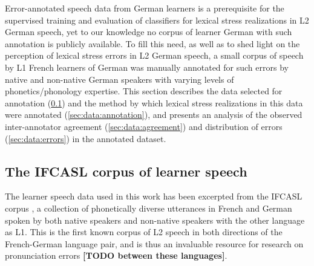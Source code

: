 \documentclass[a4paper]{article}
\newcommand{\TODO}[1]{{\color{red}\textbf{[TODO #1]}}}
\begin{document}
	Error-annotated speech data from German learners is a prerequisite for the supervised training and evaluation of classifiers for  lexical stress realizations in L2 German speech, yet to our knowledge no corpus of learner German with such annotation is publicly available. To fill this need, as well as to shed light on the perception of lexical stress errors in L2 German speech, a small corpus of speech by L1 French learners of German was manually annotated for such errors by native and non-native German speakers with varying levels of phonetics/phonology expertise. This section describes the data selected for annotation (\cref{sec:data:corpus}) and the method by which lexical stress realizations in this data were annotated (\cref{sec:data:annotation}), and presents an analysis of the observed inter-annotator agreement (\cref{sec:data:agreement}) and distribution of errors (\cref{sec:data:errors}) in the annotated dataset.
	
		\subsection{The IFCASL corpus of learner speech}
		\label{sec:data:corpus}		
		
		The learner speech data used in this work has been excerpted from the IFCASL corpus \cite{Trouvain2013,Fauth2014}, a collection of 
	phonetically diverse utterances in French and German spoken by both native speakers and non-native speakers with the other language as L1. This is the first known corpus of L2 speech in both directions of the French-German language pair, 
	and is thus an invaluable resource for research on pronunciation errors \TODO{between these languages}.
	
\end{document}
